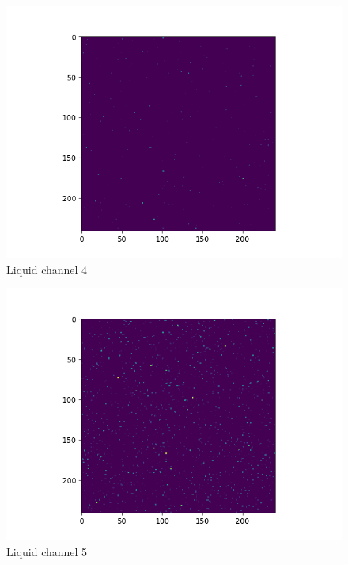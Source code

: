 \documentclass[12pt,reqno]{amsart}
\numberwithin{equation}{section}
\begin{document}
\begin{enumerate}
\begin{figure}[H]
\centering
\includegraphics[scale=0.6]{liquid_channel_4}
\caption{Liquid channel 4}
\end{figure}

\begin{figure}[H]
\centering
\includegraphics[scale=0.6]{liquid_channel_5}
\caption{Liquid channel 5}
\end{figure}


\end{enumerate}
\end{document}
